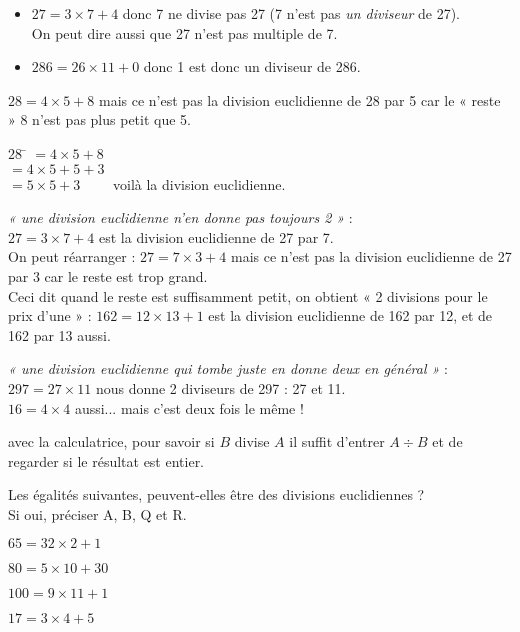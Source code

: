 \begin{exemple}[s]
	\begin{itemize}
		\item 	$27 = 3\times 7 +4$ donc 7 ne divise pas 27 (7 n'est pas \textit{un diviseur} de 27).\\
		      On peut dire aussi que 27 n'est pas multiple de 7.
		\item 	$286 = 26\times 11+0$ donc 1 est donc un diviseur de 286.
	\end{itemize}
\end{exemple}
\begin{remarque}[s]
	\begin{enumalph}
		\item 	$28 = 4\times 5 +8$ mais ce n'est pas la division euclidienne de 28 par 5 car le  «  reste »  8 n'est pas plus petit que 5.
		\begin{tabbing}
			$28$ 	\= 	$=4\times 5 + 8$\\
			\>	$=4\times 5 + 5 + 3$\\
			\>	$=5\times 5 +3\qquad$ voilà la division euclidienne.
		\end{tabbing}
		\item 	\textit{ «  une division euclidienne n'en donne pas toujours 2 » 	} :\\
		$27 = 3\times 7 + 4$ est la division euclidienne de 27 par 7.\\
		On peut réarranger : $27 = 7\times 3 +4$ mais ce n'est pas la division euclidienne de 27 par 3  car le reste est trop grand.\\
		
		Ceci dit quand le reste est suffisamment petit, on obtient  «  2 divisions pour le prix d'une  » :
		$162=12\times 13 +1$ est la division euclidienne de 162 par 12, et de 162 par 13 aussi.
		
		\item 	\textit{ «  une division euclidienne qui tombe juste en donne deux en général » } :\\
		$297=27\times 11$ nous donne 2 diviseurs de 297 : 27 et 11.\\
		$16 = 4\times4$ aussi... mais c'est deux fois le même !
		\item 	avec la calculatrice, pour savoir si $B$ divise $A$ il suffit d'entrer $A\div B$ et de regarder si le résultat est entier.
	\end{enumalph}
\end{remarque}


\begin{exercice}[]
	Les égalités suivantes, peuvent-elles être des divisions euclidiennes ?\\
	Si oui, préciser A, B, Q et R.
	\begin{multicols}{2}
		\begin{enumalph}
			\item 	$65=32\times 2 +1$
			\item 	$80=5\times 10 + 30$
			\item 	$100 = 9\times 11 +1$
			\item 	$17=    3\times4 +5	$
		\end{enumalph}
	\end{multicols}
\end{exercice}

